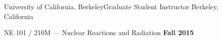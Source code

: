 
\begin{rSubsection}{University of California, Berkeley}{}{Graduate Student Instructor}{ Berkeley, California}
\item    NE 101 / 210M --- Nuclear Reactions and Radiation  \hfill {\bf Fall 2015}

% 
% 
\end{rSubsection}
% 
% 


% 
% 
% 
% 



